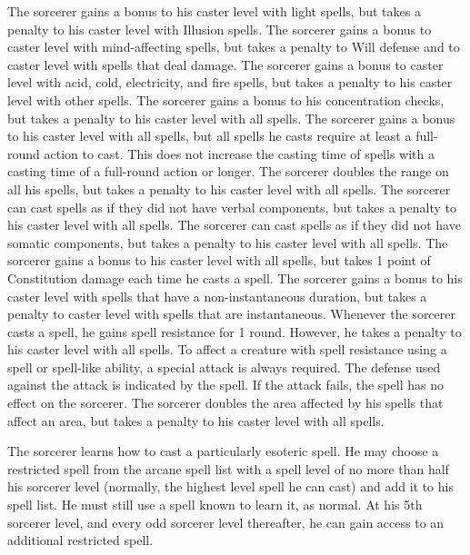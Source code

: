  The sorcerer gains a bonus to his caster level with light spells, but takes a penalty to his caster level with Illusion spells.
 The sorcerer gains a bonus to caster level with mind-affecting spells, but takes a penalty to Will defense and to caster level with spells that deal damage.
 The sorcerer gains a bonus to caster level with acid, cold, electricity, and fire spells, but takes a penalty to his caster level with other spells.
 The sorcerer gains a bonus to his concentration checks, but takes a penalty to his caster level with all spells.
 The sorcerer gains a bonus to his caster level with all spells, but all spells he casts require at least a full-round action to cast. This does not increase the casting time of spells with a casting time of a full-round action or longer.
 The sorcerer doubles the range on all his spells, but takes a penalty to his caster level with all spells.
 The sorcerer can cast spells as if they did not have verbal components, but takes a penalty to his caster level with all spells.
 The sorcerer can cast spells as if they did not have somatic components, but takes a penalty to his caster level with all spells. 
 The sorcerer gains a bonus to his caster level with all spells, but takes 1 point of Constitution damage each time he casts a spell.
 The sorcerer gains a bonus to his caster level with spells that have a non-instantaneous duration, but takes a penalty to caster level with spells that are instantaneous.
 Whenever the sorcerer casts a spell, he gains spell resistance for 1 round. However, he takes a penalty to his caster level with all spells. To affect a creature with spell resistance using a spell or spell-like ability, a special attack is always required. The defense used against the attack is indicated by the spell. If the attack fails, the spell has no effect on the sorcerer.
 The sorcerer doubles the area affected by his spells that affect an area, but takes a penalty to his caster level with all spells.

 The sorcerer learns how to cast a particularly esoteric spell. He may choose a restricted spell from the arcane spell list with a spell level of no more than half his sorcerer level (normally, the highest level spell he can cast) and add it to his spell list. He must still use a spell known to learn it, as normal. At his 5th sorcerer level, and every odd sorcerer level thereafter, he can gain access to an additional restricted spell.

